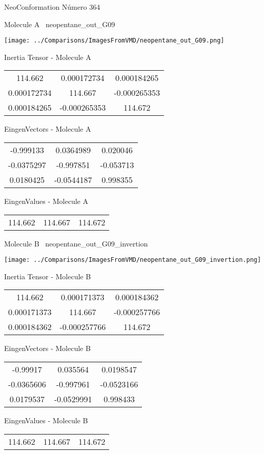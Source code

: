 \vtab[-3cm]
\begin{center}
{\large NeoConformation \tab Número 364}
\end{center}
\begin{multicols}{2}
\begin{center}

Molecule A \
neopentane\_out\_G09

\texttt{[image: ../Comparisons/ImagesFromVMD/neopentane\_out\_G09.png]}

Inertia Tensor - Molecule A \\
\begin{tabular}{|c c c|}
114.662	 & 	0.000172734	 & 	0.000184265	 \\
0.000172734	 & 	114.667	 & 	-0.000265353	 \\
0.000184265	 & 	-0.000265353	 & 	114.672
\end{tabular}

\vtab
 EingenVectors - Molecule A     \\
\begin{tabular}{|c c c|}
-0.999133	 & 	0.0364989	 & 	0.020046	 \\
-0.0375297	 & 	-0.997851	 & 	-0.053713	 \\
0.0180425	 & 	-0.0544187	 & 	0.998355
\end{tabular}

\vtab
 EingenValues - Molecule A     \\
\begin{tabular}{|c c c|}
114.662	 & 	114.667	 & 	114.672	 \\
\end{tabular}
\columnbreak

Molecule B \
neopentane\_out\_G09\_invertion

\texttt{[image: ../Comparisons/ImagesFromVMD/neopentane\_out\_G09\_invertion.png]}

Inertia Tensor - Molecule B \\
\begin{tabular}{|c c c|}
114.662	 & 	0.000171373	 & 	0.000184362	 \\
0.000171373	 & 	114.667	 & 	-0.000257766	 \\
0.000184362	 & 	-0.000257766	 & 	114.672
\end{tabular}

\vtab
 EingenVectors - Molecule B     \\
\begin{tabular}{|c c c|}
-0.99917	 & 	0.035564	 & 	0.0198547	 \\
-0.0365606	 & 	-0.997961	 & 	-0.0523166	 \\
0.0179537	 & 	-0.0529991	 & 	0.998433
\end{tabular}

\vtab
 EingenValues - Molecule B     \\
\begin{tabular}{|c c c|}
114.662	 & 	114.667	 & 	114.672	 \\
\end{tabular}

\end{center}
\end{multicols}

